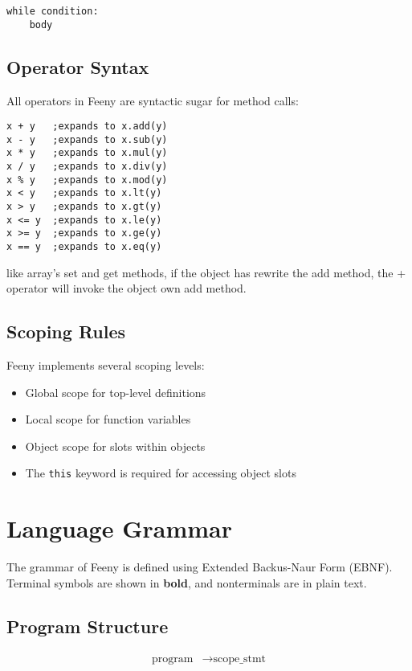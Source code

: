 \documentclass[12pt, a4paper]{article}
\begin{document}
\begin{lstlisting}
while condition:
    body
\end{lstlisting}

\subsection{Operator Syntax}
All operators in Feeny are syntactic sugar for method calls:

\begin{lstlisting}
x + y   ;expands to x.add(y)
x - y   ;expands to x.sub(y)
x * y   ;expands to x.mul(y)
x / y   ;expands to x.div(y)
x % y   ;expands to x.mod(y)
x < y   ;expands to x.lt(y)
x > y   ;expands to x.gt(y)
x <= y  ;expands to x.le(y)
x >= y  ;expands to x.ge(y)
x == y  ;expands to x.eq(y)
\end{lstlisting}
like array's set and get methods, if the object has rewrite the add method, the + operator will invoke the object own add method.

\subsection{Scoping Rules}
Feeny implements several scoping levels:
\begin{itemize}
    \item Global scope for top-level definitions
    \item Local scope for function variables
    \item Object scope for slots within objects
    \item The \texttt{this} keyword is required for accessing object slots
\end{itemize}


\section{Language Grammar}

The grammar of Feeny is defined using Extended Backus-Naur Form (EBNF). Terminal symbols are shown in \textbf{bold}, and nonterminals are in plain text.

\subsection{Program Structure}
\[
\begin{aligned}
\text{program} &\rightarrow \text{scope\_stmt} \\
\end{aligned}
\]
\end{document}
